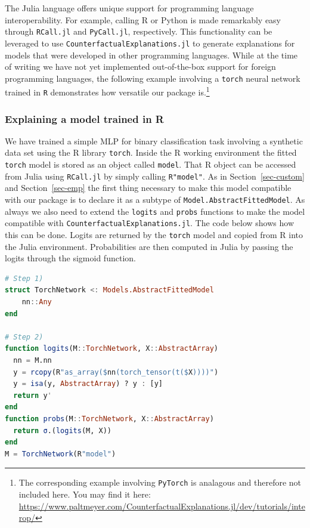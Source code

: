\documentclass{juliacon}
\begin{document}
The Julia language offers unique support for programming language
interoperability. For example, calling R or Python is made remarkably
easy through \texttt{RCall.jl} and \texttt{PyCall.jl}, respectively.
This functionality can be leveraged to use
\texttt{CounterfactualExplanations.jl} to generate explanations for
models that were developed in other programming languages. While at the
time of writing we have not yet implemented out-of-the-box support for
foreign programming languages, the following example involving a
\texttt{torch} neural network trained in \texttt{R} demonstrates how
versatile our package is.\footnote{The corresponding example involving
  \texttt{PyTorch} is analagous and therefore not included here. You may
  find it here:
  \url{https://www.paltmeyer.com/CounterfactualExplanations.jl/dev/tutorials/interop/}}

\hypertarget{explaining-a-model-trained-in-r}{%
\subsubsection{Explaining a model trained in
R}\label{explaining-a-model-trained-in-r}}

We have trained a simple MLP for binary classification task involving a
synthetic data set using the R library \texttt{torch}. Inside the R
working environment the fitted \texttt{torch} model is stored as an
object called \texttt{model}. That R object can be accessed from Julia
using \texttt{RCall.jl} by simply calling \texttt{R"model"}. As in
Section~\ref{sec-custom} and Section~\ref{sec-emp} the first thing
necessary to make this model compatible with our package is to declare
it as a subtype of \texttt{Model.AbstractFittedModel}. As always we also
need to extend the \texttt{logits} and \texttt{probs} functions to make
the model compatible with \texttt{CounterfactualExplanations.jl}. The
code below shows how this can be done. Logits are returned by the
\texttt{torch} model and copied from R into the Julia environment.
Probabilities are then computed in Julia by passing the logits through
the sigmoid function.

\begin{lstlisting}[language=Julia]
# Step 1)
struct TorchNetwork <: Models.AbstractFittedModel
    nn::Any
end

# Step 2)
function logits(M::TorchNetwork, X::AbstractArray)
  nn = M.nn
  y = rcopy(R"as_array($nn(torch_tensor(t($X))))")
  y = isa(y, AbstractArray) ? y : [y]
  return y'
end
function probs(M::TorchNetwork, X::AbstractArray)
  return σ.(logits(M, X))
end
M = TorchNetwork(R"model")
\end{lstlisting}
\end{document}
